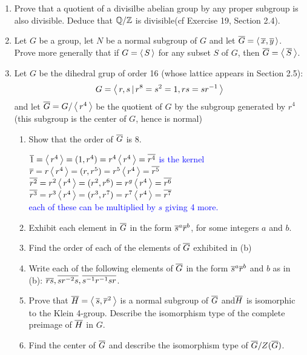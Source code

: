 \documentclass[10pt,a4paper]{report}
\newcommand{\BLUE}[1]{\textcolor{blue}{#1}}
\begin{document}
\begin{enumerate}
	\item Prove that a quotient of a divisilbe abelian group by any proper subgroup is also divisible.  Deduce that $\mathbb{Q}/\mathbb{Z}$ is divisible(cf Exercise 19, Section 2.4).
	
	\item Let $G$ be a group, let $N$ be a normal subgroup of $G$ and let $\overline{G} = \left \langle\, \overline{x},\overline{y} \,\right \rangle$.  Prove more generally that if $G = \left \langle\, S \,\right \rangle$ for any subset $S$ of $G$, then $\overline{G}=\left \langle\, \overline{S} \,\right \rangle$.
	
	\item Let $G$ be the dihedral grup of order 16 (whose lattice appears in Section 2.5):
	\begin{align*}
		G = \left \langle\, r,s\,|\,r^8=s^2=1, rs=sr^{-1} \,\right \rangle
	\end{align*}and let $\overline{G} = G/\left \langle\, r^4 \,\right \rangle$ be the quotient of $G$ by the subgroup generated by $r^4$ (this subgroup is the center of $G$,  hence is normal)
	\begin{enumerate}
		\item Show that the order of $\overline{G}$ is 8.
		
		\BLUE{ $\overline{1}=\left \langle\, r^4 \,\right \rangle = (1, r^4) = r^4\left \langle\, r^4 \,\right \rangle=\overline{r^4}$ is the kernel \\
		$\overline{r}=r\left \langle\, r^4 \,\right \rangle = (r, r^5) = r^5\left \langle\, r^4 \,\right \rangle=\overline{r^5}$ \\
		$\overline{r^2}=r^2\left \langle\, r^4 \,\right \rangle = (r^2, r^6) = r^g\left \langle\, r^4 \,\right \rangle=\overline{r^6}$\\
		$\overline{r^3}=r^3\left \langle\, r^4 \,\right \rangle= (r^3, r^7) = r^7\left \langle\, r^4 \,\right \rangle=\overline{r^7}$\\
		each of these can be multiplied by $s$ giving 4 more.
		}
		
		\item Exhibit each element in $\overline{G}$ in the form $\overline{s}^a\overline{r}^b$, for some integers $a$ and $b$.
		\item Find the order of each of the elements of $\overline{G}$ exhibited in (b)
		\item Write each of the following elements of $\overline{G}$ in the form $\overline{s}^a\overline{r}^b$ and $b$ as in (b): $\overline{rs}, \overline{sr^{-2}s}, \overline{s^{-1}r^{-1}sr}$.
		\item Prove that $\overline{H}=\left \langle\, \overline{s}, \overline{r}^2 \,\right \rangle$ is a normal subgroup of $\overline{G}$ and$\overline{H}$ is isomorphic to the Klein 4-group.  Describe the isomorphism type of the complete preimage of $\overline{H}$ in $G$.
		\item Find the center of $\overline{G}$ and describe the isomorphism type of $\overline{G}/Z(\overline{G})$.
	\end{enumerate}
	

\end{enumerate}
\end{document}
